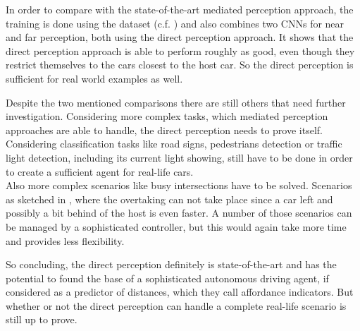 In order to compare with the state-of-the-art mediated perception approach, the training is done using the \kitti dataset (c.f. ) and also combines two CNNs for near and far perception, both using the direct perception approach. It shows that the direct perception approach is able to perform roughly as good, even though they restrict themselves to the cars closest to the host car. So the direct perception is sufficient for real world examples as well. \cite{DeepDriving} \cite{chen2015deepdriving}

Despite the two mentioned comparisons there are still others that need further investigation. Considering more complex tasks, which mediated perception approaches are able to handle, the direct perception needs to prove itself.
Considering classification tasks like road signs, pedestrians detection or traffic light detection, including its current light showing, still have to be done in order to create a sufficient agent for real-life cars. \\
Also more complex scenarios like busy intersections have to be solved. Scenarios as sketched in , where the overtaking can not take place since a car left and possibly a bit behind of the host is even faster.
A number of those scenarios can be managed by a sophisticated controller, but this would again take more time and provides less flexibility.

So concluding, the direct perception definitely is state-of-the-art and has the potential to found the base of a sophisticated autonomous driving agent, if considered as a predictor of distances, which they call affordance indicators. But whether or not the direct perception can handle a complete real-life scenario is still up to prove.